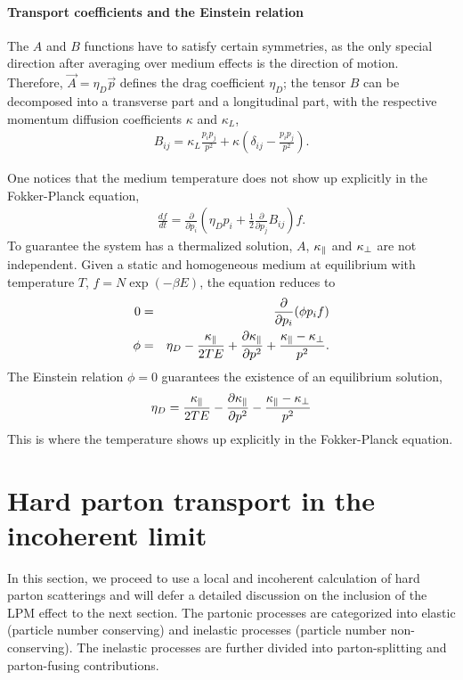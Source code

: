 \paragraph{Transport coefficients and the Einstein relation} 
The $A$ and $B$ functions have to satisfy certain symmetries, as the only special direction after averaging over medium effects is the direction of motion.
Therefore,  $\vec{A} = \eta_D \vec{p}$ defines the drag coefficient  $\eta_D$; the tensor $B$ can be decomposed into a transverse part and a longitudinal part, with the respective momentum diffusion coefficients $\kappa$ and $\kappa_L$,
\begin{eqnarray}
B_{ij} = \kappa_L \frac{p_i p_j}{p^2} + \kappa \left(\delta_{ij} - \frac{p_i p_j}{p^2}\right).
\end{eqnarray}

One notices that the medium temperature does not show up explicitly in the Fokker-Planck equation,
\begin{eqnarray}
\frac{df}{dt} = \frac{\partial}{\partial p_i}\left(\eta_D p_i + \frac{1}{2}\frac{\partial}{\partial p_j} B_{ij}\right)f.
\end{eqnarray}
To guarantee the system has a thermalized solution, $A$, $\kappa_{\|}$ and $\kappa_{\perp}$ are not independent.
Given a static and homogeneous medium at equilibrium with temperature $T$, $f = N\exp\left(-\beta E\right)$, the equation reduces to
\begin{eqnarray}
0 &=& \frac{\partial}{\partial p_i}(\phi p_i f)\\
\phi &=& \eta_D - \frac{\kappa_{\|}}{2TE} + \frac{\partial \kappa_{\|}}{\partial p^2} + \frac{\kappa_{\|}-\kappa_{\perp}}{p^2}.
\end{eqnarray}
The Einstein relation $\phi = 0$ guarantees the existence of an equilibrium solution,
\begin{eqnarray}
\eta_D = \frac{\kappa_{\|}}{2TE} - \frac{\partial \kappa_{\|}}{\partial p^2} - \frac{\kappa_{\|}-\kappa_{\perp}}{p^2}
\label{eq:ein-rel}
\end{eqnarray}
This is where the temperature shows up explicitly in the Fokker-Planck equation.

\section{Hard parton transport in the incoherent limit}
In this section, we proceed to use a local and incoherent calculation of hard parton scatterings and will defer a detailed discussion on the inclusion of the LPM effect to the next section.
The partonic processes are categorized into elastic (particle number conserving) and inelastic processes (particle number non-conserving). 
The inelastic processes are further divided into parton-splitting and parton-fusing contributions. 

